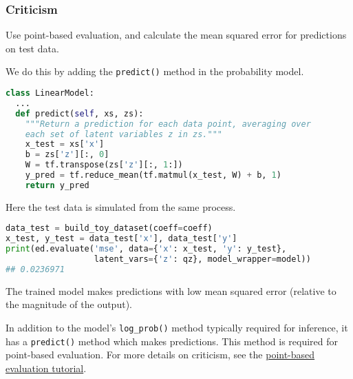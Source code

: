 \subsubsection{Criticism}

Use point-based evaluation, and calculate the mean squared
error for predictions on test data.

We do this by adding the \texttt{predict()} method in the
probability model.
\begin{lstlisting}[language=Python]
class LinearModel:
  ...
  def predict(self, xs, zs):
    """Return a prediction for each data point, averaging over
    each set of latent variables z in zs."""
    x_test = xs['x']
    b = zs['z'][:, 0]
    W = tf.transpose(zs['z'][:, 1:])
    y_pred = tf.reduce_mean(tf.matmul(x_test, W) + b, 1)
    return y_pred
\end{lstlisting}

Here the test data is simulated from the same process.
\begin{lstlisting}[language=Python]
data_test = build_toy_dataset(coeff=coeff)
x_test, y_test = data_test['x'], data_test['y']
print(ed.evaluate('mse', data={'x': x_test, 'y': y_test},
                  latent_vars={'z': qz}, model_wrapper=model))
## 0.0236971
\end{lstlisting}

The trained model makes predictions with low mean squared error
(relative to the magnitude of the output).

In addition to the model's \texttt{log_prob()} method typically required for
inference, it has a \texttt{predict()} method which makes
predictions. This method is required for point-based evaluation. For
more details on criticism, see the \href{tut_point_eval}{point-based
evaluation tutorial}.
